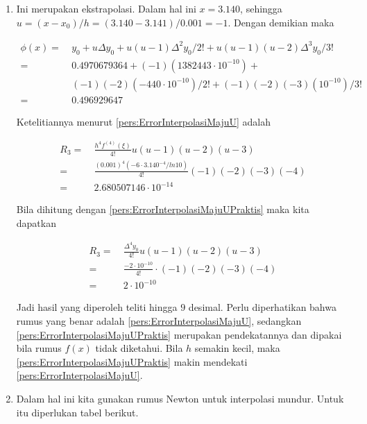 \begin{enumerate}
	Hasilnya ternyata lebih besar, tapi tetap menjamin bahwa $log~3.1413 = 0.497109413$ teliti hingga 9 desimal.

\item Ini merupakan ekstrapolasi. Dalam hal ini $x = 3.140$, sehingga $u = (x-x_0)/h = (3.140 - 3.141)/0.001 = -1$. Dengan demikian maka

	\begin{equation*}
	\begin{split}
	\phi(x) =~& y_0 + u\Delta y_0 + u(u-1)\Delta^2y_0/2! + u(u-1)(u-2)\Delta^3y_0/3!\\
	=~& 0.4970679364 + (-1)(1382443\cdot10^{-10})+\\
	& (-1)(-2)(-440\cdot10^{-10})/2!+(-1)(-2)(-3)(10^{-10})/3!\\
	=~& 0.496929647
	\end{split}
	\end{equation*}

	Ketelitiannya menurut \ref{pers:ErrorInterpolasiMajuU} adalah

	\begin{equation*}
	\begin{split}
	R_3 =~& \frac{h^4f^{(4)}(\xi)}{4!} u(u-1)(u-2)(u-3)\\
	=~& \frac{(0.001)^4(-6\cdot3.140^{-4}/ln 10)}{4!}(-1)(-2)(-3)(-4)\\
	=~& 2.680507146\cdot10^{-14}
	\end{split}
	\end{equation*}

	Bila dihitung dengan \ref{pers:ErrorInterpolasiMajuUPraktis} maka kita dapatkan

	\begin{equation*}
	\begin{split}
	R_3 =~& \frac{\Delta^4 y_0}{4!} u(u-1)(u-2)(u-3)\\
	=~& \frac{-2\cdot10^{-10}}{4!}\cdot(-1)(-2)(-3)(-4)\\
	=~& 2\cdot10^{-10}
	\end{split}
	\end{equation*}

	Jadi hasil yang diperoleh teliti hingga $9$ desimal. Perlu diperhatikan bahwa rumus yang benar adalah \ref{pers:ErrorInterpolasiMajuU}, sedangkan \ref{pers:ErrorInterpolasiMajuUPraktis} merupakan pendekatannya dan dipakai bila rumus $f(x)$ tidak diketahui. Bila $h$ semakin kecil, maka \ref{pers:ErrorInterpolasiMajuUPraktis} makin mendekati \ref{pers:ErrorInterpolasiMajuU}.

\item Dalam hal ini kita gunakan rumus Newton untuk interpolasi mundur. Untuk itu diperlukan tabel berikut.


\end{enumerate}
